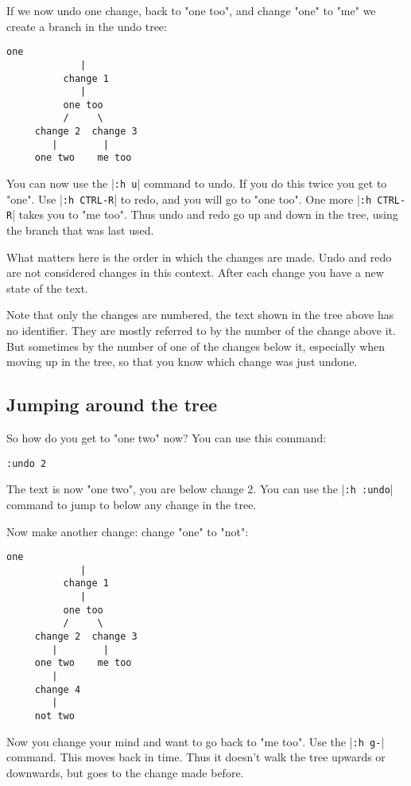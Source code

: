 If we now undo one change, back to "one too", and change "one" to "me" we create a branch in the undo tree:

\begin{Verbatim}[samepage=true]
            one 
             |
          change 1
             |
          one too 
          /     \
     change 2  change 3
        |        |
     one two    me too 
\end{Verbatim}

You can now use the |\texttt{:h u}| command to undo.
If you do this twice you get to "one".
Use |\texttt{:h CTRL-R}| to redo, and you will go to "one too".
One more |\texttt{:h CTRL-R}| takes you to "me too".
Thus undo and redo go up and down in the tree, using the branch that was last used.

What matters here is the order in which the changes are made.
Undo and redo are not considered changes in this context.
After each change you have a new state of the text.

Note that only the changes are numbered, the text shown in the tree above has no identifier.
They are mostly referred to by the number of the change above it.
But sometimes by the number of one of the changes below it, especially when moving up in the tree, so that you know which change was just undone.
\subsection{Jumping around the tree}
So how do you get to "one two" now?  You can use this command:

\begin{Verbatim}[samepage=true]
 :undo 2
\end{Verbatim}

The text is now "one two", you are below change 2.
You can use the |\texttt{:h :undo}| command to jump to below any change in the tree.

Now make another change: change "one" to "not":

\begin{Verbatim}[samepage=true]
            one 
             |
          change 1
             |
          one too 
          /     \
     change 2  change 3
        |        |
     one two    me too 
        |
     change 4
        |
     not two 
\end{Verbatim}

Now you change your mind and want to go back to "me too".
Use the |\texttt{:h g-}| command.
This moves back in time.
Thus it doesn't walk the tree upwards or downwards, but goes to the change made before.

